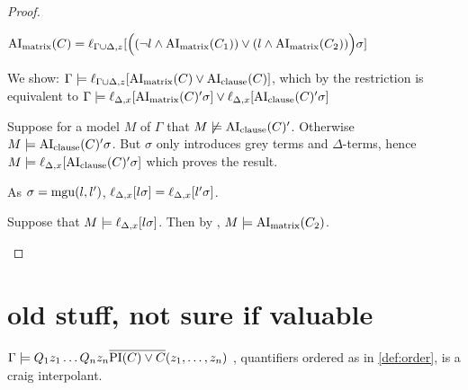 \documentclass[,%
	paper=a4,%
	DIV14, 
	liststotoc,
	bibtotoc,
	draft=false,%
	numbers=noendperiod
]{scrartcl}
\begin{document}
\begin{proof}
\begin{description}
\begin{itemize}
					$\operatorname{AI}_\mathrm{matrix}(C) =
					\ell_{\Gamma\cup\Delta,z}[\Big( (\lnot l \land \operatorname{AI}_\mathrm{matrix}(C_1)) \lor (l \land \operatorname{AI}_\mathrm{matrix}(C_2)) \Big) \sigma]
					$


					We show: $\Gamma \models \ell_{\Gamma\cup\Delta,z}[ \operatorname{AI}_\mathrm{matrix}(C) \lor \operatorname{AI}_\mathrm{clause}(C) ]$,
					which by the restriction is equivalent to $\Gamma \models \ell_{\Delta,x}[ \operatorname{AI}_\mathrm{matrix}(C)'\sigma] \lor \ell_{\Delta,x}[\operatorname{AI}_\mathrm{clause}(C)'\sigma ]$


					Suppose for a model $M$ of $\Gamma$ that $M \not\models \operatorname{AI}_\mathrm{clause}(C)'$.
					Otherwise $M \models \operatorname{AI}_\mathrm{clause}(C)'\sigma$.
					But $\sigma$ only introduces grey terms and $\Delta$-terms, hence $M \models \ell_{\Delta,x}[ \operatorname{AI}_\mathrm{clause}(C)'\sigma ]$ which proves the result.

					As $\sigma = \operatorname{mgu}(l, l')$, $\ell_{\Delta,x}[l\sigma] = \ell_{\Delta,x}[l'\sigma]$.

					Suppose that $M\models \ell_{\Delta,x}[l\sigma]$. Then by \markB, $M\models \operatorname{AI}_\mathrm{matrix}(C_2)$.






			\end{itemize}
	\end{description}


\end{proof}


\clearpage
\section{old stuff, not sure if valuable}

\begin{prop}
	$\Gamma \models Q_1 z_1 \ldots Q_n z_n \overline{\operatorname{PI}(C) \lor C}(z_1, \ldots, z_n)$ , quantifiers ordered as in \ref{def:order}, is a craig interpolant.
\end{prop}
\end{document}
